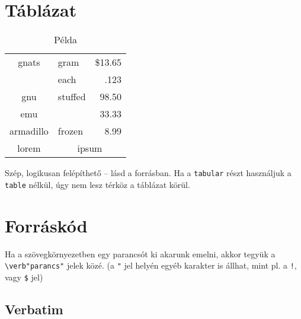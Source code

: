 \documentclass[a4paper]{report}             %
\begin{document}
\section{Táblázat}          %

\begin{table}[ht]           %

    \centering
    \begin{tabular}{||c|lr|}

        \hline
        gnats       & gram      & \$13.65         \\
        \cline{2-3}
                    & each      & .123            \\
        \hline
        gnu         & stuffed   & 98.50           \\
        \cline{1-1} \cline{3-3}
        emu         &           & 33.33           \\
        \hline
        armadillo   & frozen    & 8.99            \\
        \hline
        lorem       & \multicolumn{2}{|c|}{ipsum} \\
        \hline

    \end{tabular}

    \caption{Példa}         %
    \label{tbl-pelda}       %

\end{table}

Szép, logikusan felépíthető -- lásd a forrásban. Ha a \verb"tabular" részt
használjuk a \verb"table" nélkül, úgy nem lesz térköz a táblázat körül.


\section{Forráskód}

Ha a szövegkörnyezetben egy parancsót ki akarunk emelni, akkor tegyük a
\verb!\verb"parancs"! jelek közé. (a \verb!"! jel helyén egyéb karakter is
állhat, mint pl. a \verb"!", vagy \verb"$" jel)


\subsection{Verbatim}
\end{document}
